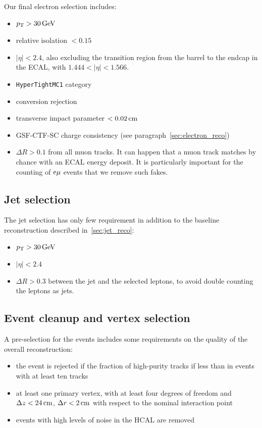 Our final electron selection includes:
\begin{itemize}
    \item $\pt > \unit[30]{GeV}$
    \item relative isolation $< 0.15$
    \item $|\eta| < 2.4$, also excluding the transition region from the
        barrel to the endcap in the ECAL, with $1.444 < |\eta| < 1.566$.
    \item \texttt{HyperTightMC1} category
    \item conversion rejection
    \item transverse impact parameter $< \unit[0.02]{cm}$
    \item GSF-CTF-SC charge consistency (see
        paragraph~\ref{sec:electron_reco})
    \item $\Delta R > 0.1$ from all muon tracks. It can happen that a muon
        track matches by chance with an ECAL energy deposit. It is
        particularly important for the counting of $\mathrm{e} \mu$ events that we remove such fakes.
\end{itemize}

\subsection{Jet selection}\label{sec:jet_selection}
The jet selection has only few requirement in addition to the baseline
reconstruction described in~\ref{sec:jet_reco}:
\begin{itemize}
    \item $\pt > \unit[30]{GeV}$
    \item $|\eta| < 2.4$
    \item $\Delta R > 0.3$ between the jet and the selected leptons, to
        avoid double counting the leptons as jets.
\end{itemize}

\subsection{Event cleanup and vertex selection}\label{sec:event_cleanup}
A pre-selection for the events includes some requirements on the quality of
the overall reconstruction:
\begin{itemize}
    \item the event is rejected if the fraction of high-purity tracks if
        less than  in events with at least ten tracks
    \item at least one primary vertex, with at least four degrees of freedom
        and $\Delta z < \unit[24]{cm}$, $\Delta r < \unit[2]{cm}$ with
        respect to the nominal interaction point
    \item events with high levels of noise in the HCAL are removed
\end{itemize}

